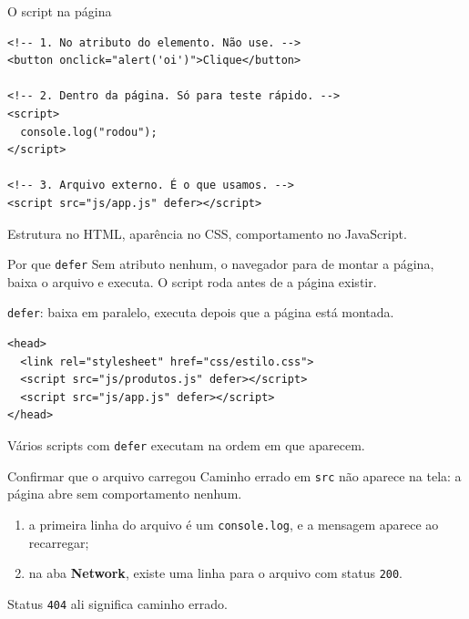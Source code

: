 \documentclass{beamer}
\begin{document}
\begin{frame}[fragile]{O script na página}
	\begin{verbatim}
<!-- 1. No atributo do elemento. Não use. -->
<button onclick="alert('oi')">Clique</button>

<!-- 2. Dentro da página. Só para teste rápido. -->
<script>
  console.log("rodou");
</script>

<!-- 3. Arquivo externo. É o que usamos. -->
<script src="js/app.js" defer></script>
	\end{verbatim}

	\vspace{0.2cm}
	Estrutura no HTML, aparência no CSS, comportamento no JavaScript.
\end{frame}

\begin{frame}[fragile]{Por que \texttt{defer}}
	Sem atributo nenhum, o navegador para de montar a página, baixa o arquivo e
	executa. O script roda antes de a página existir.

	\vspace{0.3cm}
	\texttt{defer}: baixa em paralelo, executa depois que a página está montada.

	\begin{verbatim}
<head>
  <link rel="stylesheet" href="css/estilo.css">
  <script src="js/produtos.js" defer></script>
  <script src="js/app.js" defer></script>
</head>
	\end{verbatim}

	\vspace{0.2cm}
	Vários scripts com \texttt{defer} executam na ordem em que aparecem.
\end{frame}

\begin{frame}{Confirmar que o arquivo carregou}
	Caminho errado em \texttt{src} não aparece na tela: a página abre sem
	comportamento nenhum.

	\vspace{0.4cm}
	\begin{enumerate}
		\item a primeira linha do arquivo é um \texttt{console.log}, e a mensagem
		      aparece ao recarregar;
		\item na aba \textbf{Network}, existe uma linha para o arquivo com status
		      \texttt{200}.
	\end{enumerate}

	\vspace{0.4cm}
	Status \texttt{404} ali significa caminho errado.
\end{frame}
\end{document}
